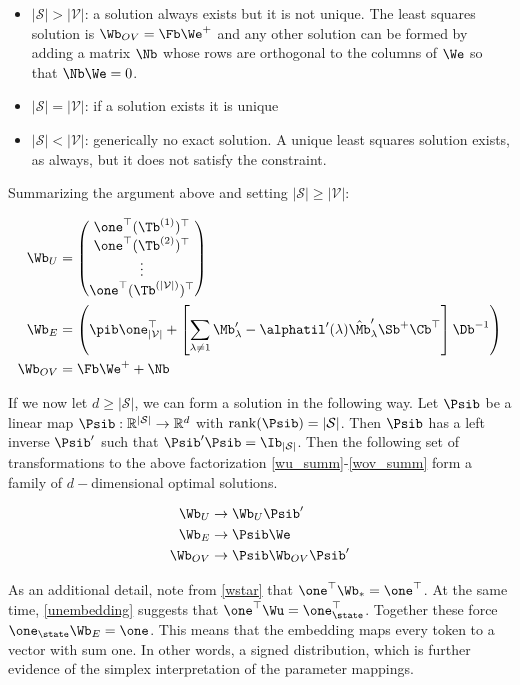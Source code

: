 \documentclass{article}
\begin{document}
\begin{itemize}
    \item $\mathbf{|\mathcal{S}| > |\mathcal{V}|}$: a solution always exists but it is not unique. The least squares solution is $\Wb_{OV} = \Fb \We^+$ and any other solution can be formed by adding a matrix $\Nb$ whose rows are orthogonal to the columns of $\We$ so that $\Nb \We = 0$. 
    \item $\mathbf{|\mathcal{S}| = |\mathcal{V}|}$: if a solution exists it is unique
    \item $\mathbf{|\mathcal{S}| < |\mathcal{V}|}$: generically no exact solution. A unique least squares solution exists, as always, but it does not satisfy the constraint.
\end{itemize}
Summarizing the argument above and setting $|\mathcal{S}| \ge |\mathcal{V}|$:

\begin{align}
    \Wb_U &= \begin{pmatrix}
        \one^\top (\Tb^{(1)})^\top \\
        \one^\top (\Tb^{(2)})^\top \\
        \vdots\\
        \one^\top (\Tb^{(|\mathcal{V}|)})^\top \label{wu_summ}
    \end{pmatrix} \\
    \Wb_E &= \left (\pib \one_{|\mathcal{V}|}^\top + \left[ \sum_{\lambda \neq 1} \Mb'_\lambda - \alphatil'(\lambda) \hat{\Mb}'_\lambda \Sb^{+}\Cb^\top\right ]  \Db^{-1}\right) \\
    \Wb_{OV} &= \Fb \We^+ + \Nb \label{wov_summ}
\end{align}

If we now let $d \ge |\mathcal{S}|$, we can form a solution in the following way. Let $\Psib$ be a linear map $\Psib : \mathbb{R}^{|\mathcal{S}|}\to \mathbb{R}^d$ with $\mathrm{rank}(\Psib) = |\mathcal{S}|$. Then $\Psib$ has a left inverse $\Psib'$ such that $\Psib' \Psib = \Ib_{|\mathcal{S}|}$. Then the following set of transformations to the above factorization \eqref{wu_summ}-\eqref{wov_summ} form a family of $d-$dimensional optimal solutions.

\begin{align}
    \Wb_U &\to \Wb_U \Psib' \\
    \Wb_E &\to \Psib \We \\
    \Wb_{OV} &\to  \Psib \Wb_{OV} \Psib'
\end{align}

As an additional detail, note from \eqref{wstar} that $\one^\top \Wb_* = \one^\top$. At the same time, \eqref{unembedding} suggests that $\one^\top\Wu = \one_\state^\top$. Together these force $\one_\state\Wb_E = \one$. This means that the embedding maps every token to a vector with sum one. In other words, a signed distribution, which is further evidence of the simplex interpretation of the parameter mappings. 
\end{document}
